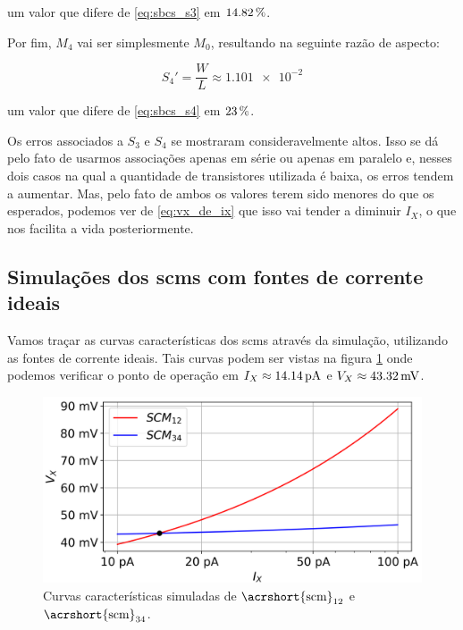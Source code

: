 \documentclass[10pt,a4paper]{extreport}
\newcommand{\?}{\stackrel{?}{=}}
\newcommand{\sis}[2]{\complexnum{#1}\,\si[per-mode=symbol]{#2}}
\newcommand{\mysize}{0.69}
\begin{document}
\noindent um valor que difere de \eqref{eq:sbcs_s3} em $\sis{14.82}{\percent}$.

Por fim, $M_4$ vai ser simplesmente $M_0$, resultando na seguinte razão de aspecto:

\begin{equation}
    \label{eq:associacao_s4}
    S_4'=\frac{W}{L}\approx\num{1.101e-2}
\end{equation}

\noindent um valor que difere de \eqref{eq:sbcs_s4} em $\sis{23}{\percent}$.

Os erros associados a $S_3$ e $S_4$ se mostraram consideravelmente altos. Isso se dá pelo fato de usarmos associações apenas em série ou apenas em paralelo e, nesses dois casos na qual a quantidade de transistores utilizada é baixa, os erros tendem a aumentar. Mas, pelo fato de ambos os valores terem sido menores do que os esperados, podemos ver de \eqref{eq:vx_de_ix} que isso vai tender a diminuir $I_X$, o que nos facilita a vida posteriormente.

\subsection{Simulações dos \acrshort{scm}s com fontes de corrente ideais}

Vamos traçar as curvas características dos \acrshort{scm}s através da simulação, utilizando as fontes de corrente ideais. Tais curvas podem ser vistas na figura \ref{fig:scm_simulado} onde podemos verificar o ponto de operação em $I_X\approx\sis{14.14}{\pico\ampere}$ e $V_X\approx\sis{43.32}{\milli\volt}$.

\begin{figure}[htp!]
    \includegraphics[width=\mysize\linewidth]{Imagens/scm_simulado.png}
    \centering
    \caption{Curvas características simuladas de $\text{\acrshort{scm}}_{12}$ e $\text{\acrshort{scm}}_{34}$.}
    \label{fig:scm_simulado}
\end{figure}
\end{document}
